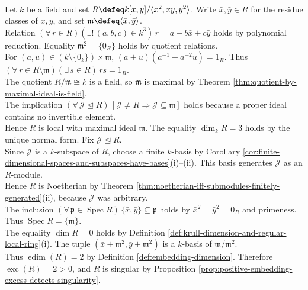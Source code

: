 \begin{example} \label{ex:square-zero-singular-local-ring} \\
Let $k$ be a field and set $R\defeq k[x,y]/\langle x^2,xy,y^2\rangle$. Write $\bar{x},\bar{y}\in R$ for the residue classes of $x,y$, and set $\mathfrak{m}\defeq\langle\bar{x},\bar{y}\rangle$.\\
Relation $(\forall\,r\in R)(\exists!\,(a,b,c)\in k^3)\,r=a+b\bar{x}+c\bar{y}$ holds by polynomial reduction. Equality $\mathfrak{m}^2=\{0_R\}$ holds by quotient relations.\\
For $(a,u)\in(k\setminus\{0_k\})\times\mathfrak{m}$, $(a+u)(a^{-1}-a^{-2}u)=1_R$. Thus $(\forall\,r\in R\setminus\mathfrak{m})(\exists\,s\in R)\,rs=1_R$.\\
The quotient $R/\mathfrak{m}\cong k$ is a field, so $\mathfrak{m}$ is maximal by Theorem \ref{thm:quotient-by-maximal-ideal-is-field}.\\
The implication $(\forall\,\mathcal{J}\trianglelefteq R)\,[\mathcal{J}\neq R\Rightarrow\mathcal{J}\subseteq\mathfrak{m}]$ holds because a proper ideal contains no invertible element.\\
Hence $R$ is local with maximal ideal $\mathfrak{m}$. The equality $\dim_kR=3$ holds by the unique normal form. Fix $\mathcal{J}\trianglelefteq R$.\\
Since $\mathcal{J}$ is a $k$-subspace of $R$, choose a finite $k$-basis by Corollary \ref{cor:finite-dimensional-spaces-and-subspaces-have-bases}(i)--(ii). This basis generates $\mathcal{J}$ as an $R$-module.\\
Hence $R$ is Noetherian by Theorem \ref{thm:noetherian-iff-submodules-finitely-generated}(ii), because $\mathcal{J}$ was arbitrary.\\
The inclusion $(\forall\,\mathfrak{p}\in\operatorname{Spec}R)\,\{\bar{x},\bar{y}\}\subseteq\mathfrak{p}$ holds by $\bar{x}^2=\bar{y}^2=0_R$ and primeness. Thus $\operatorname{Spec}R=\{\mathfrak{m}\}$.\\
The equality $\dim R=0$ holds by Definition \ref{def:krull-dimension-and-regular-local-ring}(i). The tuple $(\bar{x}+\mathfrak{m}^2,\bar{y}+\mathfrak{m}^2)$ is a $k$-basis of $\mathfrak{m}/\mathfrak{m}^2$.\\
Thus $\operatorname{edim}(R)=2$ by Definition \ref{def:embedding-dimension}. Therefore $\operatorname{exc}(R)=2>0$, and $R$ is singular by Proposition \ref{prop:positive-embedding-excess-detects-singularity}.
\end{example}
